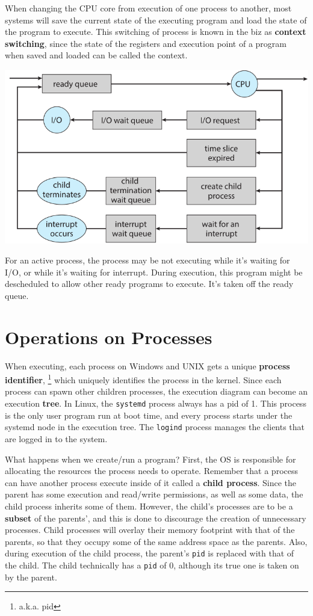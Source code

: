 \documentclass{tufte-handout}
\begin{document}
When changing the CPU core from execution of one process to another, most systems will save the 
current state of the executing program and load the state of the program to execute. This 
switching of process is known in the biz as \textbf{context switching}, since the state of the 
registers and execution point of a program when saved and loaded can be called the context.
\begin{marginfigure}
		\includegraphics[scale=0.3]{queueing}
		\caption{For an active process, the process may be not executing while it's
		waiting for I/O, or while it's waiting for interrupt. During execution,
		this program might be descheduled to allow other ready programs to execute.
		It's taken off the ready queue.}
\end{marginfigure}
\section{Operations on Processes}
When executing, each process on Windows and UNIX gets a unique \textbf{process identifier}, 
\footnote{a.k.a. pid}
which uniquely identifies the process in the kernel. Since each process can spawn other 
children processes, the execution diagram can become an execution \textbf{tree}. In Linux, 
the \texttt{systemd} process always has a pid of 1. This process is the only user program
run at boot time, and every process starts under the systemd node in the execution tree. 
The \texttt{logind} process manages the clients that are logged in to the system.

What happens when we create/run a program? First, the OS is responsible for allocating
the resources the process needs to operate. Remember that a process can have another
process execute inside of it called a \textbf{child process}. Since the parent has some
execution and read/write permissions, as well as some data, the child process inherits 
some of them. However, the child's processes are to be a \textbf{subset} of the parents',
and this is done to discourage the creation of unnecessary processes.
Child processes will overlay their memory footprint with that of the parents, so that 
they occupy some of the same address space as the parents. Also, during execution of 
the child process, the parent's \texttt{pid} is replaced with that of the child. 
The child technically has a \texttt{pid} of 0, although its true one is taken on by 
the parent.
\end{document}
